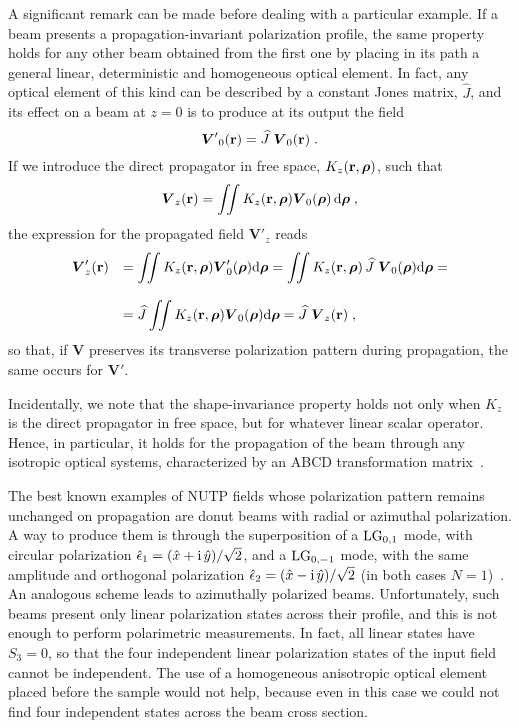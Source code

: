 \documentclass{article}
\newcommand{\bs}{\boldsymbol}
\begin{document}
A significant remark can be made before dealing with a particular example. If a beam presents a propagation-invariant polarization profile, the same property holds for any other beam obtained from the first one by placing in its path a general linear, deterministic and homogeneous optical element.  In fact, any optical element of this kind can be described by a constant Jones matrix, $\widehat J$, and its effect on a  beam at $z=0$ is to produce at its output the field
%
\begin{equation}
{\bs V'}_0({\bf r})= 
\widehat J \; {\bs V}_0({\bf r})
\; .
\label{aniso}
\end{equation}
%
If we introduce the direct propagator in free space, $K_z({\bf r}, {\bs \rho})$, such that
%
\begin{equation}
{\bs V}_z({\bf r})
= 
\displaystyle\iint
K_z({\bf r}, {\bs \rho})
{\bs V}_0({\bs \rho})
\, {\rm d}{\bs \rho}
\; ,
\label{propDir}
\end{equation}
%
the expression for the propagated field ${\bs V}'_z$  reads
%
\begin{equation}
\begin{array}{rl}
{\bs V}'_z({\bf r})
&
=
\displaystyle\iint
K_z({\bf r}, {\bs \rho})
{\bs V}'_0({\bs \rho})
{\rm d}{\bs \rho}
=
\displaystyle\iint
K_z({\bf r}, {\bs \rho})
\, \widehat J \; {\bs V}_0({\bs \rho})
{\rm d}{\bs \rho}
=
\\ \\
&=
\widehat J 
\displaystyle\iint
K_z({\bf r}, {\bs \rho})
{\bs V}_0({\bs \rho})
{\rm d}{\bs \rho}
=
\widehat J \; 
{\bs V}_z({\bf r})
\; ,
\label{spbSecondo}
\end{array}
\end{equation}
%
so that, if ${\bs V}$ preserves its transverse polarization pattern during propagation, the same occurs for ${\bs V}'$.

Incidentally, we note that the shape-invariance property holds not only when $K_z$ is the direct propagator in free space, but for whatever linear scalar operator. Hence, in particular, it holds for the propagation of the beam through any isotropic optical systems, characterized by an ABCD transformation matrix~\cite{Siegman:Lasers86}.

The best known examples of NUTP fields whose polarization pattern remains unchanged on propagation are donut beams with radial or azimuthal polarization. A way to produce them is through the superposition of a  ${\rm LG}_{0,1}$ mode, with circular polarization ${\hat\epsilon}_1=(\hat x + {\rm i} \, \hat y)/\sqrt{2}$, and a  ${\rm LG}_{0,-1}$ mode, with the same amplitude and orthogonal polarization ${\hat \epsilon}_2=(\hat x - {\rm i} \, \hat y)/\sqrt{2}$ (in both cases $N=1$)~\cite{Gori:JOSAA01,Zhan:AOP09,Ramirez:JOPT09}. An analogous scheme leads to azimuthally polarized beams. Unfortunately, such beams present only linear polarization states across their profile, and this is not enough to perform polarimetric measurements.  In fact, all linear states have $S_3=0$, so that the four independent linear polarization states of the input field cannot be independent.
The use of a homogeneous anisotropic optical element placed before the sample would not help, because even in this case we could not find four independent states across the beam cross section. 
\end{document}
